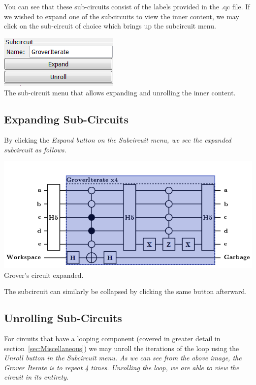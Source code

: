 \documentclass[10pt]{article}
\theoremstyle{definition}
\begin{document}
You can see that these sub-circuits consist of the labels provided in the .qc file. If we wished to expand one of the subcircuits to view the inner content, we may click on the sub-circuit of choice which brings up the subcircuit menu.

\begin{center}
\includegraphics{Figures/SubCircuits/SubCircuitMenu.png} \\
The sub-circuit menu that allows expanding and unrolling the inner content.
\end{center}

\subsection{Expanding Sub-Circuits}\label{sec:ExpandingSubCircuits}

By clicking the \em Expand \em button on the \em Subcircuit \em menu, we see the expanded subcircuit as follows.

\begin{center}
\includegraphics[scale=.7]{Figures/SubCircuits/GroverCircuitExpand} \\
Grover's circuit expanded.
\end{center}

The subcircuit can similarly be collapsed by clicking the same button afterward.


\subsection{Unrolling Sub-Circuits}\label{sec:UnrollingSubCircuits}

For circuits that have a looping component (covered in greater detail in section~\ref{sec:Miscellaneous}) we may unroll the iterations of the loop using the \em Unroll \em button in the \em Subcircuit \em menu. As we can see from the above image, the Grover Iterate is to repeat 4 times. Unrolling the loop, we are able to view the circuit in its entirety.
\end{document}
